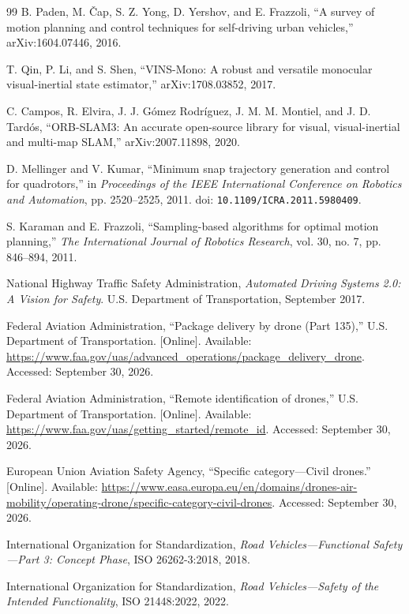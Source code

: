\documentclass[11pt,a4paper]{article}
\begin{document}
\begin{thebibliography}{99}
B. Paden, M. \v{C}ap, S. Z. Yong, D. Yershov, and E. Frazzoli, ``A survey of motion planning and control techniques for self-driving urban vehicles,'' arXiv:1604.07446, 2016.

T. Qin, P. Li, and S. Shen, ``VINS-Mono: A robust and versatile monocular visual-inertial state estimator,'' arXiv:1708.03852, 2017.

C. Campos, R. Elvira, J. J. G\'omez Rodr\'iguez, J. M. M. Montiel, and J. D. Tard\'os, ``ORB-SLAM3: An accurate open-source library for visual, visual-inertial and multi-map SLAM,'' arXiv:2007.11898, 2020.

D. Mellinger and V. Kumar, ``Minimum snap trajectory generation and control for quadrotors,'' in \emph{Proceedings of the IEEE International Conference on Robotics and Automation}, pp. 2520--2525, 2011. doi: \nolinkurl{10.1109/ICRA.2011.5980409}.

S. Karaman and E. Frazzoli, ``Sampling-based algorithms for optimal motion planning,'' \emph{The International Journal of Robotics Research}, vol. 30, no. 7, pp. 846--894, 2011.

National Highway Traffic Safety Administration, \emph{Automated Driving Systems 2.0: A Vision for Safety}. U.S. Department of Transportation, September 2017.

Federal Aviation Administration, ``Package delivery by drone (Part 135),'' U.S. Department of Transportation. [Online]. Available: \url{https://www.faa.gov/uas/advanced_operations/package_delivery_drone}. Accessed: September 30, 2026.

Federal Aviation Administration, ``Remote identification of drones,'' U.S. Department of Transportation. [Online]. Available: \url{https://www.faa.gov/uas/getting_started/remote_id}. Accessed: September 30, 2026.

European Union Aviation Safety Agency, ``Specific category---Civil drones.'' [Online]. Available: \url{https://www.easa.europa.eu/en/domains/drones-air-mobility/operating-drone/specific-category-civil-drones}. Accessed: September 30, 2026.

International Organization for Standardization, \emph{Road Vehicles---Functional Safety---Part 3: Concept Phase}, ISO 26262-3:2018, 2018.

International Organization for Standardization, \emph{Road Vehicles---Safety of the Intended Functionality}, ISO 21448:2022, 2022.

\end{thebibliography}
\end{document}
